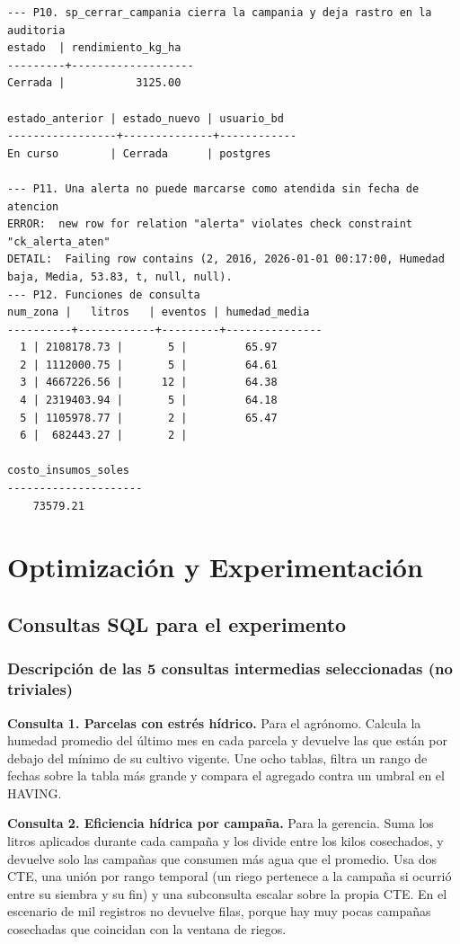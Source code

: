 \documentclass[11pt,letterpaper]{article}
\newcommand{\tbus}{\textunderscore\allowbreak}
\newcommand{\tb}[1]{{\ttfamily\let\_\tbus #1}}
\begin{document}
\begin{lstlisting}[style=plano]
--- P10. sp_cerrar_campania cierra la campania y deja rastro en la auditoria
estado  | rendimiento_kg_ha 
---------+-------------------
Cerrada |           3125.00

estado_anterior | estado_nuevo | usuario_bd 
-----------------+--------------+------------
En curso        | Cerrada      | postgres

--- P11. Una alerta no puede marcarse como atendida sin fecha de atencion
ERROR:  new row for relation "alerta" violates check constraint "ck_alerta_aten"
DETAIL:  Failing row contains (2, 2016, 2026-01-01 00:17:00, Humedad baja, Media, 53.83, t, null, null).
--- P12. Funciones de consulta
num_zona |   litros   | eventos | humedad_media 
----------+------------+---------+---------------
  1 | 2108178.73 |       5 |         65.97
  2 | 1112000.75 |       5 |         64.61
  3 | 4667226.56 |      12 |         64.38
  4 | 2319403.94 |       5 |         64.18
  5 | 1105978.77 |       2 |         65.47
  6 |  682443.27 |       2 |              

costo_insumos_soles 
---------------------
    73579.21
\end{lstlisting}


\section{Optimización y Experimentación}

\subsection{Consultas SQL para el experimento}
\label{sec:consultas}

\subsubsection{Descripción de las 5 consultas intermedias seleccionadas (no triviales)}

\textbf{Consulta 1. Parcelas con estrés hídrico.} Para el agrónomo. Calcula la humedad promedio del último mes en cada parcela y devuelve las que están por debajo del mínimo de su cultivo vigente. Une ocho tablas, filtra un rango de fechas sobre la tabla más grande y compara el agregado contra un umbral en el \tb{HAVING}.

\textbf{Consulta 2. Eficiencia hídrica por campaña.} Para la gerencia. Suma los litros aplicados durante cada campaña y los divide entre los kilos cosechados, y devuelve solo las campañas que consumen más agua que el promedio. Usa dos CTE, una unión por rango temporal (un riego pertenece a la campaña si ocurrió entre su siembra y su fin) y una subconsulta escalar sobre la propia CTE. En el escenario de mil registros no devuelve filas, porque hay muy pocas campañas cosechadas que coincidan con la ventana de riegos.
\end{document}
